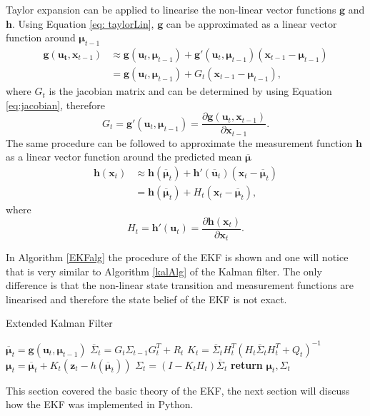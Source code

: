 \documentclass[12pt,oneside,openany,a4paper, %
afrikaans,english,
]{memoir}
\numberwithin{equation}{chapter}
\begin{document}
Taylor expansion can be applied to linearise the non-linear vector functions $\bm{g}$ and $\bm{h}$. Using  Equation \ref{eq: taylorLin}, $\bm{g}$ can be approximated as a linear vector function around $\bm{\mu}_{t-1}$
\begin{equation}\label{eq:linear_taylor}
\begin{split}
\bm{g}(\bm{u_t}, \bm{x}_{t-1}) & \approx \bm{g}(\bm{u}_t, \bm{\mu}_{t-1}) + \bm{g}'(\bm{u}_t, \bm{\mu}_{t-1})(\bm{x}_{t-1} - \bm{\mu}_{t-1})\\
& = \bm{g}(\bm{u}_t, \bm{\mu}_{t-1}) + G_t(\bm{x}_{t-1} - 
\bm{\mu}_{t-1}),
\end{split}  
\end{equation}
where $G_t$ is the jacobian matrix and can be determined by using Equation \ref{eq:jacobian}, therefore
\begin{equation}\label{eq:Gt}
G_t = \bm{g}'(\bm{u}_t, \bm{\mu}_{t-1}) = \frac{\partial \bm{g}(\bm{u}_t, \bm{x}_{t-1})}{\partial \bm{x}_{t-1}}.
\end{equation}
The same procedure can be followed to approximate the measurement function $\bm{h}$ as a linear vector function around the predicted mean $\overline{\bm{\mu}}$
\begin{equation}
\begin{split}
\bm{h}(\bm{x}_{t}) & \approx \bm{h}(\bm{\overline{\mu}}_{t}) + \bm{h}'(\bm{\overline{u}}_t)(\bm{x}_{t} - \bm{\overline{\mu}}_{t})\\
& = \bm{h}(\bm{\overline{\mu}}_t) + H_t(\bm{x}_{t} - 
\bm{\overline{\mu}}_{t}),
\end{split}  
\end{equation}
where
\begin{equation}
H_t = \bm{h}'(\bm{u}_t) = \frac{\partial \bm{h}(\bm{x}_{t})}{\partial \bm{x}_{t}}.
\end{equation}

In Algorithm \ref{EKFalg} the procedure of the EKF is shown and one will notice that is very similar to Algorithm \ref{kalAlg} of the Kalman filter. The only difference is that the non-linear state transition and measurement functions are linearised and therefore the state belief of the EKF is not exact.


\begin{algorithm}
\caption{Extended Kalman Filter}\label{EKFalg}
\begin{algorithmic}[1]
\State $\overline{\bm{\mu}}_t = \bm{g}(\bm{u}_t, \bm{\mu}_{t-1})$
\State $\overline{\Sigma}_t = G_t \Sigma_{t-1} G_t^T + R_t$
\State $K_t = \overline{\Sigma}_t H_t^T(H_t\overline{\Sigma}_t H_t^T + Q_t)^{-1}$
\State $\bm{\mu}_t = \overline{\bm{\mu}}_t + K_t(\bm{z}_t - h(\overline{\bm{\mu}}_t))$
\State $\Sigma_t = (I - K_tH_t)\overline{\Sigma}_t$
\State \textbf{return} $\bm{\mu}_t, \Sigma_t$
\EndProcedure
\end{algorithmic}
\end{algorithm}
This section covered the basic theory of the EKF, the next section will discuss how the EKF was implemented in Python.
\end{document}

